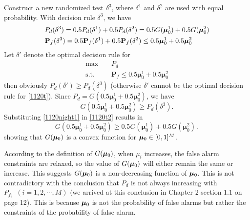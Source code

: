 Construct a new randomized test $\delta^3$, where $\delta^1$ and $\delta^2$ are used with equal probability. With decision rule $\delta^3$, we have 
\begin{subequations}
\begin{align}
\label{1120night1}
&P_d(\delta^3) = 0.5P_d(\delta^1)+0.5P_d(\delta^2) = 0.5G(\boldsymbol{\mu}_0^1) + 0.5G(\boldsymbol{\mu}_0^2)\\
&\mathbf{P}_{f}(\delta^3) = 0.5\mathbf{P}_f(\delta^1)+0.5\mathbf{P}_f(\delta^2) \leq 0.5\boldsymbol{\mu}^1_0 + 0.5\boldsymbol{\mu}^2_0
\end{align}
\end{subequations}
Let $\delta'$ denote the optimal decision rule for 
 \begin{equation}
 \begin{split}
 \label{1120t}
 \max&\;\;\;\;P_d\\
 \text{s.t.}&\;\;\;\;\mathbf{P}_f \leq 0.5\boldsymbol{\mu}^1_0 + 0.5\boldsymbol{\mu}^2_0
 \end{split}
 \end{equation}
then obviously $P_d(\delta') \geq P_d(\delta^3)$ (otherwise $\delta'$ cannot be the optimal decision rule for \eqref{1120t}). Since $P_d = G(0.5\boldsymbol{\mu}^1_0 + 0.5\boldsymbol{\mu}^2_0)$, we have  
\begin{equation}
\label{1120t2}
G(0.5\boldsymbol{\mu}^1_0 + 0.5\boldsymbol{\mu}^2_0) \geq  P_d(\delta^3).
\end{equation}
Substituting \eqref{1120night1} in \eqref{1120t2} results in
\begin{equation}
\label{1120t3}
G(0.5\boldsymbol{\mu}^1_0 + 0.5\boldsymbol{\mu}^2_0) \geq 0.5 G(\boldsymbol{\mu}^1_0)+ 0.5 G(\boldsymbol{\mu}^2_0)\,.
\end{equation}
showing that  $G(\boldsymbol{\mu}_0)$ is a convex function for $\boldsymbol{\mu}_0 \in [0, 1]^M$.

According to the definition of $G(\boldsymbol{\mu}_0)$, when $\mu_i$ increases, the false alarm constraints are relaxed, 
so the value of $G(\boldsymbol{\mu}_0)$ will either remain the same or increase. 
This suggests $G(\boldsymbol{\mu}_0)$ is a non-decreasing function of $\boldsymbol{\mu}_0$. 
This is not contradictory with the conclusion that 
$P_d$ is not always increasing with $P_{f_i}\;\;(i=1, 2, \cdots, M)$  (we arrived at this conclusion in Chapter 2 section 1.1 on page 12).  This is because $\boldsymbol{\mu}_0$ is not the probability of false alarms but rather the constraints of the probability of false alarm. 

